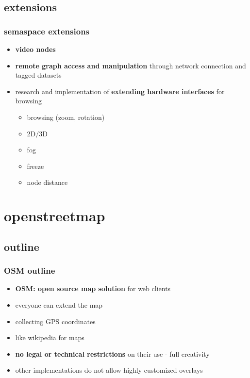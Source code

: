 \documentclass[blue]{beamer}
\begin{document}
\subsection{extensions}
\frame
{
\frametitle{\textbf{semaspace extensions}}
\begin{itemize}
	\item \textbf{video nodes}
	\item \textbf{remote graph access and manipulation} through network connection and tagged datasets
	\item research and implementation of \textbf{extending hardware interfaces} for browsing
		\begin{itemize}[<+-|alert@+>]
			\item browsing (zoom, rotation)
			\item 2D/3D
			\item fog
			\item freeze
			\item node distance
		\end{itemize}
\end{itemize}
}



\section{openstreetmap}
\subsection{outline}
\frame
{
\frametitle{\textbf{OSM outline}}
\begin{itemize}
	\item \textbf{OSM: open source map solution} for web clients
	\item everyone can extend the map
	\item collecting GPS coordinates
	\item like wikipedia for maps
	\item \textbf{no legal or technical restrictions} on their use - full creativity
	\item other implementations do not allow highly customized overlays
\end{itemize}
}
\end{document}
